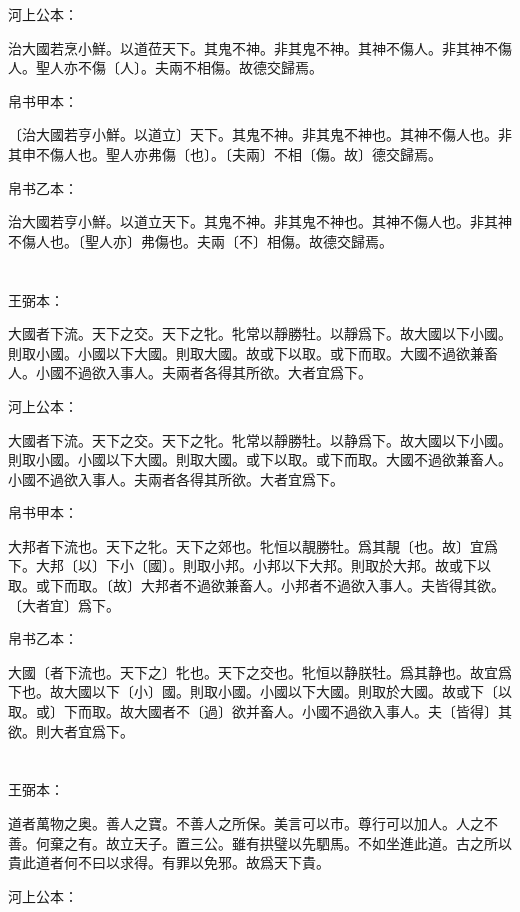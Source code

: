 \documentclass[a5paper]{ctexbook}
\begin{document}
    河上公本：

    治大國若烹小鮮。以道莅天下。其鬼不神。非其鬼不神。其神不傷人。非其神不傷人。聖人亦不傷〔人〕。夫兩不相傷。故德交歸焉。

    帛书甲本：

    〔治大國若亨小鮮。以道立〕天下。其鬼不神。非其鬼不神也。其神不傷人也。非其申不傷人也。聖人亦弗傷〔也〕。〔夫兩〕不相〔傷。故〕德交歸焉。

    帛书乙本：

    治大國若亨小鮮。以道立天下。其鬼不神。非其鬼不神也。其神不傷人也。非其神不傷人也。〔聖人亦〕弗傷也。夫兩〔不〕相傷。故德交歸焉。

    \chapter{}
    王弼本：

    大國者下流。天下之交。天下之牝。牝常以靜勝牡。以靜爲下。故大國以下小國。則取小國。小國以下大國。則取大國。故或下以取。或下而取。大國不過欲兼畜人。小國不過欲入事人。夫兩者各得其所欲。大者宜爲下。

    河上公本：

    大國者下流。天下之交。天下之牝。牝常以靜勝牡。以静爲下。故大國以下小國。則取小國。小國以下大國。則取大國。或下以取。或下而取。大國不過欲兼畜人。小國不過欲入事人。夫兩者各得其所欲。大者宜爲下。

    帛书甲本：

    大邦者下流也。天下之牝。天下之郊也。牝恒以靚勝牡。爲其靚〔也。故〕宜爲下。大邦〔以〕下小〔國〕。則取小邦。小邦以下大邦。則取於大邦。故或下以取。或下而取。〔故〕大邦者不過欲兼畜人。小邦者不過欲入事人。夫皆得其欲。〔大者宜〕爲下。

    帛书乙本：

    大國〔者下流也。天下之〕牝也。天下之交也。牝恒以静朕牡。爲其静也。故宜爲下也。故大國以下〔小〕國。則取小國。小國以下大國。則取於大國。故或下〔以取。或〕下而取。故大國者不〔過〕欲并畜人。小國不過欲入事人。夫〔皆得〕其欲。則大者宜爲下。

    \chapter{}
    王弼本：

    道者萬物之奥。善人之寶。不善人之所保。美言可以市。尊行可以加人。人之不善。何棄之有。故立天子。置三公。雖有拱璧以先駟馬。不如坐進此道。古之所以貴此道者何不曰以求得。有罪以免邪。故爲天下貴。

    河上公本：
\end{document}
